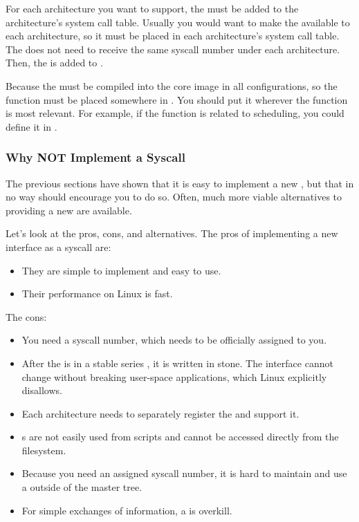 For each architecture you want to support, the  must be added to the architecture’s system call table.
Usually you would want to make the  available to each architecture, so it must be placed in each architecture's system call table.
The  does not need to receive the same syscall number under each architecture.
Then, the  is added to .

Because the  must be compiled into the core  image in all configurations, so the  function must be placed somewhere in .
You should put it wherever the function is most relevant.
For example, if the function is related to scheduling, you could define it in .

\subsubsection{Why \textbf{NOT} Implement a Syscall}\label{subsubsec:Not_Implement_Syscall}
The previous sections have shown that it is easy to implement a new , but that in no way should encourage you to do so.
Often, much more viable alternatives to providing a new  are available.

Let’s look at the pros, cons, and alternatives.
The pros of implementing a new interface as a syscall are:
\begin{itemize}[noitemsep]
\item They are simple to implement and easy to use.
\item Their performance on Linux is fast.
\end{itemize}

The cons:
\begin{itemize}[noitemsep]
\item You need a syscall number, which needs to be officially assigned to you.
\item After the  is in a stable series , it is written in stone.
  The interface cannot change without breaking user-space applications, which Linux explicitly disallows.
\item Each architecture needs to separately register the  and support it.
\item {}s are not easily used from scripts and cannot be accessed directly from the filesystem.
\item Because you need an assigned syscall number, it is hard to maintain and use a  outside of the master  tree.
\item For simple exchanges of information, a  is overkill.
\end{itemize}

